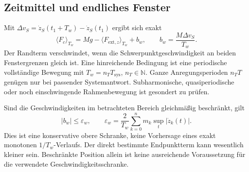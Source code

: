 \documentclass[11pt,a4paper]{article}
\begin{document}
\subsection{Zeitmittel und endliches Fenster}
Mit $\Delta v_S=\dot z_S(t_1+T_w)-\dot z_S(t_1)$ ergibt sich exakt
\begin{equation}
\langle F_c\rangle_{T_w}=Mg-\langle F_{\mathrm{ext},z}\rangle_{T_w}+b_w,
\qquad b_w=\frac{M\Delta v_S}{T_w}.
\label{eq:fenster}
\end{equation}
Der Randterm verschwindet, wenn die Schwerpunktgeschwindigkeit an beiden Fenstergrenzen gleich ist. Eine hinreichende Bedingung ist eine periodische vollständige Bewegung mit $T_w=n_T T_{\mathrm{sys}}$, $n_T\in\mathbb N$. Ganze Anregungsperioden $n_TT$ genügen nur bei passender Systemantwort. Subharmonische, quasiperiodische oder noch einschwingende Rahmenbewegung ist gesondert zu prüfen.

Sind die Geschwindigkeiten im betrachteten Bereich gleichmäßig beschränkt, gilt
\begin{equation}
|b_w|\le\varepsilon_w,\qquad
\varepsilon_w=\frac{2}{T_w}\sum_{k=0}^{n}m_k\sup_t|\dot z_k(t)|.
\label{eq:bound}
\end{equation}
Dies ist eine konservative obere Schranke, keine Vorhersage eines exakt monotonen $1/T_w$-Verlaufs. Der direkt bestimmte Endpunktterm kann wesentlich kleiner sein. Beschränkte Position allein ist keine ausreichende Voraussetzung für die verwendete Geschwindigkeitsschranke.
\end{document}
